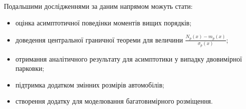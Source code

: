 Подальшими дослідженнями за даним напрямом можуть стати:
\begin{itemize}
\item оцінка асимптотичної поведінки моментів вищих порядків;
\item доведення центральної граничної теореми для величини $\frac{N_{p}(x) - m_{p}(x)}{\sigma_{p}(x)}$;
\item отримання аналітичного результату для асимптотики у випадку двовимірної парковки;
\item підтримка додатком змінних розмірів автомобілів;
\item створення додатку для моделювання багатовимірного розміщення.
\end{itemize}

